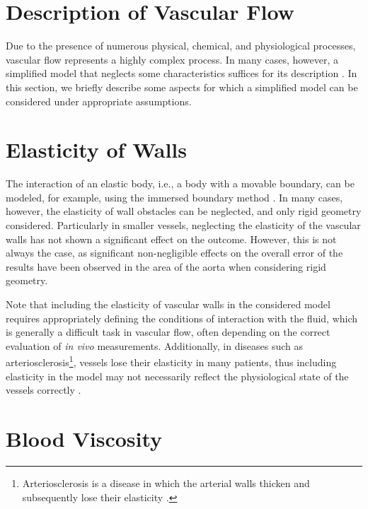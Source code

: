 \section{Description of Vascular Flow}\label{cevni proudeni}
Due to the presence of numerous physical, chemical, and physiological processes, vascular flow represents a highly complex process. In many cases, however, a simplified model that neglects some characteristics suffices for its description \cite{Saloner2019}. In this section, we briefly describe some aspects for which a simplified model can be considered under appropriate assumptions.

\section*{\fontsize{11}{15}\selectfont Elasticity of Walls}
The interaction of an elastic body, i.e., a body with a movable boundary, can be modeled, for example, using the immersed boundary method \cite{Peskin}. In many cases, however, the elasticity of wall obstacles can be neglected, and only rigid geometry considered. Particularly in smaller vessels, neglecting the elasticity of the vascular walls has not shown a significant effect on the outcome. \cite{DempereMarco2006} However, this is not always the case, as significant non-negligible effects on the overall error of the results have been observed in the area of the aorta when considering rigid geometry. \cite{LANTZ2011}

Note that including the elasticity of vascular walls in the considered model requires appropriately defining the conditions of interaction with the fluid, which is generally a difficult task in vascular flow, often depending on the correct evaluation of \textit{in vivo} measurements. Additionally, in diseases such as arteriosclerosis\footnote{Arteriosclerosis is a disease in which the arterial walls thicken and subsequently lose their elasticity \cite{Fishbein2015}.}, vessels lose their elasticity in many patients, thus including elasticity in the model may not necessarily reflect the physiological state of the vessels correctly \cite{Saloner2019}.

\section*{\fontsize{11}{15}\selectfont Blood Viscosity}

